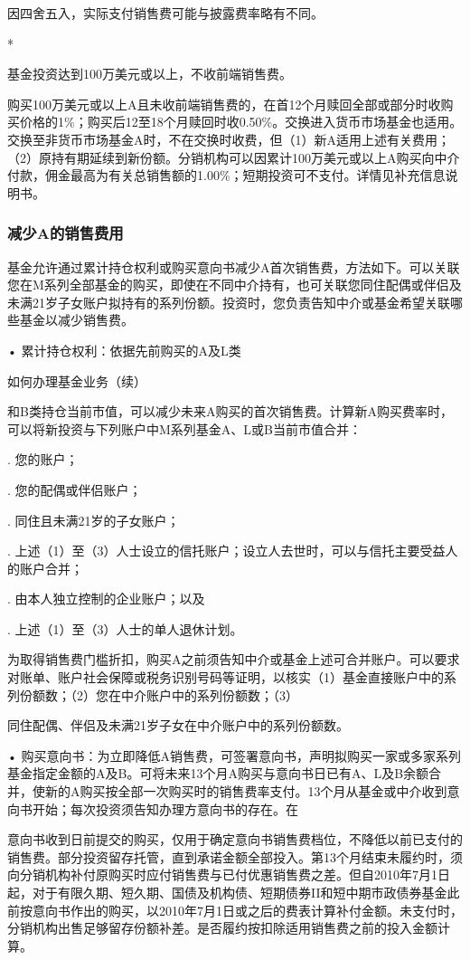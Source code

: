\documentclass[UTF8,fontset=none,11pt,a4paper]{ctexart}
\begin{document}
 因四舍五入，实际支付销售费可能与披露费率略有不同。\par\smallskip
*

基金投资达到100万美元或以上，不收前端销售费。


\textbf{}

购买100万美元或以上A且未收前端销售费的，在首12个月赎回全部或部分时收购买价格的1\%；购买后12至18个月赎回时收0.50\%。交换进入货币市场基金也适用。交换至非货币市场基金A时，不在交换时收费，但（1）新A适用上述有关费用；（2）原持有期延续到新份额。分销机构可以因累计100万美元或以上A购买向中介付款，佣金最高为有关总销售额的1.00\%；短期投资可不支付。详情见补充信息说明书。


\subsubsection*{减少A的销售费用}
基金允许通过累计持仓权利或购买意向书减少A首次销售费，方法如下。可以关联您在M系列全部基金的购买，即使在不同中介持有，也可关联您同住配偶或伴侣及未满21岁子女账户拟持有的系列份额。投资时，您负责告知中介或基金希望关联哪些基金以减少销售费。

\noindent • 累计持仓权利：依据先前购买的A及L类\par\smallskip

\par{}\label{originalpage14}
如何办理基金业务（续）

和B类持仓当前市值，可以减少未来A购买的首次销售费。计算新A购买费率时，可以将新投资与下列账户中M系列基金A、L或B当前市值合并：


. 您的账户；


. 您的配偶或伴侣账户；


. 同住且未满21岁的子女账户；


. 上述（1）至（3）人士设立的信托账户；设立人去世时，可以与信托主要受益人的账户合并；


. 由本人独立控制的企业账户；以及


. 上述（1）至（3）人士的单人退休计划。


为取得销售费门槛折扣，购买A之前须告知中介或基金上述可合并账户。可以要求对账单、账户社会保障或税务识别号码等证明，以核实（1）基金直接账户中的系列份额数；（2）您在中介账户中的系列份额数；（3）

同住配偶、伴侣及未满21岁子女在中介账户中的系列份额数。

\noindent • 购买意向书：为立即降低A销售费，可签署意向书，声明拟购买一家或多家系列基金指定金额的A及B。可将未来13个月A购买与意向书日已有A、L及B余额合并，使新的A购买按全部一次购买时的销售费率支付。13个月从基金或中介收到意向书开始；每次投资须告知办理方意向书的存在。在\par\smallskip
意向书收到日前提交的购买，仅用于确定意向书销售费档位，不降低以前已支付的销售费。部分投资留存托管，直到承诺金额全部投入。第13个月结束未履约时，须向分销机构补付原购买时应付销售费与已付优惠销售费之差。但自2010年7月1日起，对于有限久期、短久期、国债及机构债、短期债券II和短中期市政债券基金此前按意向书作出的购买，以2010年7月1日或之后的费表计算补付金额。未支付时，分销机构出售足够留存份额补差。是否履约按扣除适用销售费之前的投入金额计算。
\end{document}
